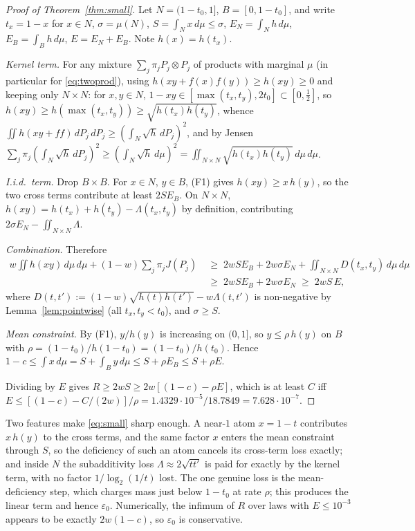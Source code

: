 \documentclass[11pt,a4paper]{article}
\theoremstyle{definition}
\theoremstyle{remark}
\newcommand{\ent}{h}
\begin{document}
\begin{proof}[Proof of Theorem~\ref{thm:small}]
Let $N=(1-t_0,1]$, $B=[0,1-t_0]$, and write $t_x=1-x$ for $x\in N$, $\sigma=\mu(N)$, $S=\int_Nx\,d\mu\le\sigma$, $E_N=\int_N\ent\,d\mu$, $E_B=\int_B\ent\,d\mu$, $E=E_N+E_B$. Note $\ent(x)=\ent(t_x)$.

\emph{Kernel term.} For any mixture $\sum_j\pi_jP_j\otimes P_j$ of products with marginal $\mu$ (in particular for \eqref{eq:twoprod}), using $\ent(xy+f(x)f(y))\ge\ent(xy)\ge0$ and keeping only $N\times N$: for $x,y\in N$, $1-xy\in[\max(t_x,t_y),2t_0]\subset[0,\frac12]$, so $\ent(xy)\ge\ent(\max(t_x,t_y))\ge\sqrt{\ent(t_x)\ent(t_y)}$, whence $\iint\ent(xy+ff)\,dP_j\,dP_j\ge(\int_N\sqrt\ent\,dP_j)^2$, and by Jensen $\sum_j\pi_j(\int_N\sqrt\ent\,dP_j)^2\ge(\int_N\sqrt\ent\,d\mu)^2=\iint_{N\times N}\sqrt{\ent(t_x)\ent(t_y)}\,d\mu\,d\mu$.

\emph{I.i.d.\ term.} Drop $B\times B$. For $x\in N$, $y\in B$, (F1) gives $\ent(xy)\ge x\,\ent(y)$, so the two cross terms contribute at least $2SE_B$. On $N\times N$, $\ent(xy)=\ent(t_x)+\ent(t_y)-\Lambda(t_x,t_y)$ by definition, contributing $2\sigma E_N-\iint_{N\times N}\Lambda$.

\emph{Combination.} Therefore
\begin{align*}
w\iint\ent(xy)\,d\mu\,d\mu+(1-w)\sum_j\pi_jJ(P_j)\;&\ge\;2wSE_B+2w\sigma E_N+\iint_{N\times N}D(t_x,t_y)\,d\mu\,d\mu\\
&\ge\;2wSE_B+2w\sigma E_N\;\ge\;2wS\,E,
\end{align*}
where $D(t,t'):=(1-w)\sqrt{\ent(t)\ent(t')}-w\Lambda(t,t')$ is non-negative by Lemma~\ref{lem:pointwise} (all $t_x,t_y<t_0$), and $\sigma\ge S$.

\emph{Mean constraint.} By (F1), $y/\ent(y)$ is increasing on $(0,1]$, so $y\le\rho\,\ent(y)$ on $B$ with $\rho=(1-t_0)/\ent(1-t_0)=(1-t_0)/\ent(t_0)$. Hence $1-c\le\int x\,d\mu=S+\int_By\,d\mu\le S+\rho E_B\le S+\rho E$.

Dividing by $E$ gives $R\ge2wS\ge2w[(1-c)-\rho E]$, which is at least $C$ iff $E\le[(1-c)-C/(2w)]/\rho=1.4329\cdot10^{-5}/18.7849=7.628\cdot10^{-7}$.
\end{proof}

Two features make \eqref{eq:small} sharp enough. A near-$1$ atom $x=1-t$ contributes $x\,\ent(y)$ to the cross terms, and the same factor $x$ enters the mean constraint through $S$, so the deficiency of such an atom cancels its cross-term loss exactly; and inside $N$ the subadditivity loss $\Lambda\approx2\sqrt{tt'}$ is paid for exactly by the kernel term, with no factor $1/\log_2(1/t)$ lost. The one genuine loss is the mean-deficiency step, which charges mass just below $1-t_0$ at rate $\rho$; this produces the linear term and hence $\varepsilon_0$. Numerically, the infimum of $R$ over laws with $E\le10^{-3}$ appears to be exactly $2w(1-c)$, so $\varepsilon_0$ is conservative.
\end{document}
